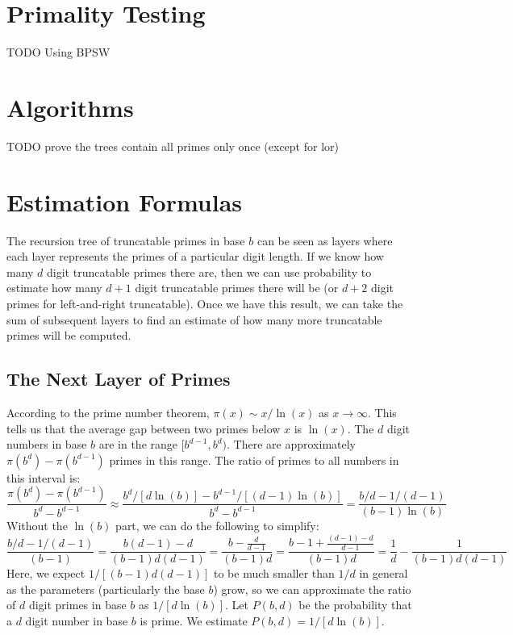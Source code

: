 \documentclass[12pt]{article}
\begin{document}
\section{Primality Testing}

TODO Using BPSW

\section{Algorithms}

TODO prove the trees contain all primes only once (except for lor)

\section{Estimation Formulas}

The recursion tree of truncatable primes in base $b$ can be seen as layers where each layer represents the primes of a particular digit length. If we know how many $d$ digit truncatable primes there are, then we can use probability to estimate how many $d+1$ digit truncatable primes there will be (or $d+2$ digit primes for left-and-right truncatable). Once we have this result, we can take the sum of subsequent layers to find an estimate of how many more truncatable primes will be computed.

\subsection{The Next Layer of Primes}

According to the prime number theorem, $\pi(x)\sim x/\ln(x)$ as $x\to\infty$. This tells us that the average gap between two primes below $x$ is $\ln(x)$. The $d$ digit numbers in base $b$ are in the range $[b^{d-1},b^d)$. There are approximately $\pi(b^d)-\pi(b^{d-1})$ primes in this range. The ratio of primes to all numbers in this interval is:
\begin{equation}
\frac{\pi(b^d)-\pi(b^{d-1})}{b^d-b^{d-1}} \approx \frac{b^d/[d\ln(b)]-b^{d-1}/[(d-1)\ln(b)]}{b^d-b^{d-1}} = \frac{b/d-1/(d-1)}{(b-1)\ln(b)}
\end{equation}
Without the $\ln(b)$ part, we can do the following to simplify:
\begin{equation}
\frac{b/d-1/(d-1)}{(b-1)} = \frac{b(d-1)-d}{(b-1)d(d-1)} = \frac{b-\frac{d}{d-1}}{(b-1)d} = \frac{b-1+\frac{(d-1)-d}{d-1}}{(b-1)d} = \frac{1}{d}-\frac{1}{(b-1)d(d-1)}
\end{equation}
Here, we expect $1/[(b-1)d(d-1)]$ to be much smaller than $1/d$ in general as the parameters (particularly the base $b$) grow, so we can approximate the ratio of $d$ digit primes in base $b$ as $1/[d\ln(b)]$. Let $P(b,d)$ be the probability that a $d$ digit number in base $b$ is prime. We estimate $P(b,d)=1/[d\ln(b)]$.
\end{document}
